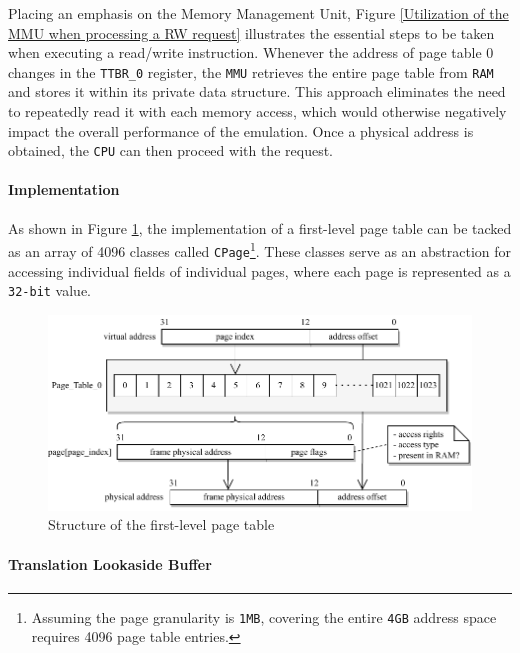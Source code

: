 \documentclass[english, ing, kiv, he, iso690numb, pdf]{fasthesis}
\begin{document}
	Placing an emphasis on the Memory Management Unit, Figure \ref{Utilization of the MMU when processing a RW request} illustrates the essential steps to be taken when executing a read/write instruction. Whenever the address of page table 0 changes in the \texttt{TTBR\_0} register, the \texttt{MMU} retrieves the entire page table from \texttt{RAM} and stores it within its private data structure. This approach eliminates the need to repeatedly read it with each memory access, which would otherwise negatively impact the overall performance of the emulation. Once a physical address is obtained, the \texttt{CPU} can then proceed with the request.
	
	\paragraph{Implementation}
	
	As shown in Figure \ref{Structure of the first-level page table}, the implementation of a first-level page table can be tacked as an array of 4096 classes called \texttt{CPage}\footnote{Assuming the page granularity is \texttt{1MB}, covering the entire \texttt{4GB} address space requires 4096 page table entries.}. These classes serve as an abstraction for accessing individual fields of individual pages, where each page is represented as a \texttt{32-bit} value.
	
	\begin{figure}[ht]
		\centering
		\includegraphics[width=1.0\textwidth]{img/diagrams/page_table.pdf}
		\caption{Structure of the first-level page table}
		\label{Structure of the first-level page table}
	\end{figure}
	
	\paragraph{Translation Lookaside Buffer}
	
\end{document}
